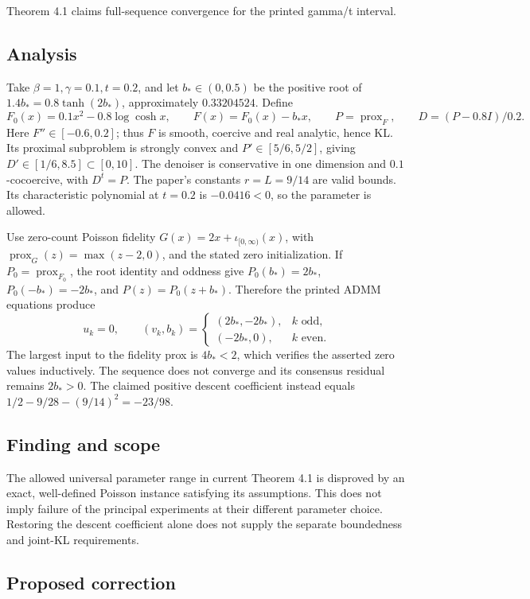 \documentclass[11pt]{article}
\begin{document}
Theorem 4.1 claims full-sequence convergence for the printed gamma/t interval.

\subsection*{Analysis}

Take \(\beta=1,\gamma=0.1,t=0.2\), and let \(b_*\in(0,0.5)\) be the positive root of \(1.4b_*=0.8\tanh(2b_*)\), approximately \(0.33204524\). Define \[F_0(x)=0.1x^2-0.8\log\cosh x,\qquad F(x)=F_0(x)-b_*x,\qquad P=\operatorname{prox}_F,\qquad D=(P-0.8I)/0.2.\] Here \(F''\in[-0.6,0.2]\); thus \(F\) is smooth, coercive and real analytic, hence KL. Its proximal subproblem is strongly convex and \(P'\in[5/6,5/2]\), giving \(D'\in[1/6,8.5]\subset[0,10]\). The denoiser is conservative in one dimension and \(0.1\)-cocoercive, with \(D^t=P\). The paper’s constants \(r=L=9/14\) are valid bounds. Its characteristic polynomial at \(t=0.2\) is \(-0.0416<0\), so the parameter is allowed.

Use zero-count Poisson fidelity \(G(x)=2x+\iota_{[0,\infty)}(x)\), with \(\operatorname{prox}_G(z)=\max(z-2,0)\), and the stated zero initialization. If \(P_0=\operatorname{prox}_{F_0}\), the root identity and oddness give \(P_0(b_*)=2b_*\), \(P_0(-b_*)=-2b_*\), and \(P(z)=P_0(z+b_*)\). Therefore the printed ADMM equations produce \[u_k=0,\qquad(v_k,b_k)=\begin{cases}(2b_*,-2b_*),&k\text{ odd},\\(-2b_*,0),&k\text{ even}.\end{cases}\] The largest input to the fidelity prox is \(4b_*<2\), which verifies the asserted zero values inductively. The sequence does not converge and its consensus residual remains \(2b_*>0\). The claimed positive descent coefficient instead equals \(1/2-9/28-(9/14)^2=-23/98\).

\subsection*{Finding and scope}

The allowed universal parameter range in current Theorem 4.1 is disproved by an exact, well-defined Poisson instance satisfying its assumptions. This does not imply failure of the principal experiments at their different parameter choice. Restoring the descent coefficient alone does not supply the separate boundedness and joint-KL requirements.

\subsection*{Proposed correction}
\end{document}

